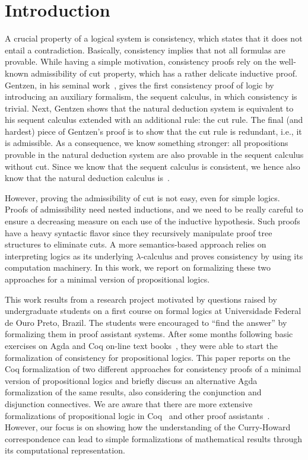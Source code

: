 \begin{coqdoccode}
\coqdocemptyline
\coqdocemptyline
\end{coqdoccode}
\section{Introduction}


A crucial property of a logical system is consistency, which states that it does not
entail a contradiction. Basically, consistency implies that not all formulas
are provable.  While having a simple motivation, consistency proofs rely on
the well-known admissibility of cut property, which has a rather delicate inductive proof.
Gentzen, in his seminal work~\cite{Gentzen36}, gives the first consistency proof of logic by introducing an
auxiliary formalism, the sequent calculus, in which consistency is trivial. Next, Gentzen shows
that the natural deduction system is equivalent to his sequent calculus extended with an
additional rule: the cut rule. The final (and hardest) piece of Gentzen's proof is to 
show that the cut rule is redundant, i.e., it is admissible. As a consequence, we know
something stronger: all propositions provable in the natural deduction system are also provable
in the sequent calculus without cut. Since we know that the sequent calculus is consistent,
we hence also know that the natural deduction calculus is~\cite{Negri2001}.


However, proving the admissibility of cut is not easy, even for simple logics.
Proofs of admissibility need nested inductions, and we need to be really careful to
ensure a decreasing measure on each use of the inductive hypothesis. Such proofs have
a heavy syntactic flavor since they recursively manipulate proof tree structures to
eliminate cuts. A more semantics-based approach relies on interpreting logics as its
underlying $\lambda$-calculus and proves consistency by using its computation machinery.
In this work, we report on formalizing these two approaches for a minimal version of
propositional logics.


This work results from a research project motivated by questions raised by
undergraduate students on a first course on formal logics at Universidade Federal de Ouro Preto, Brazil.
The students were encouraged to ``find the answer'' by formalizing them in proof assistant systems.
After some months following basic exercises on Agda and Coq on-line text books~\cite{plfa2019,Pierce18},
they were able to start the formalization of consistency for propositional logics. This paper reports on
the Coq formalization of two different approaches for consistency proofs of a minimal version of
propositional logics and briefly discuss an alternative Agda formalization of the same results, also considering
the conjunction and disjunction connectives. We are aware that there are more extensive formalizations of propositional logic 
 in Coq~\cite{doorn2015} and other proof assistants~\cite{Nipkow17}. However, our focus is
on showing how the understanding of the Curry-Howard correspondence can lead to simple formalizations
of mathematical results through its computational representation.


